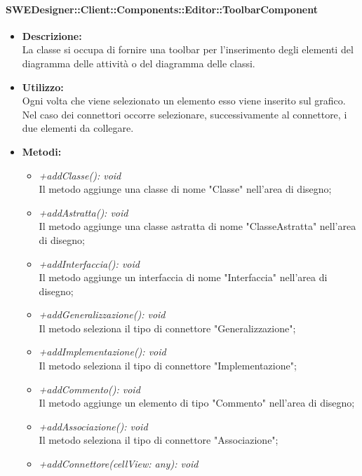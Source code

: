 			\paragraph{SWEDesigner::Client::Components::Editor::ToolbarComponent}
				\begin{itemize}
          			\item \textbf{Descrizione:}\\
          			La classe si occupa di fornire una toolbar per l'inserimento degli elementi del diagramma delle attività o del diagramma delle classi.
          			\item \textbf{Utilizzo:}\\
          			Ogni volta che viene selezionato un elemento esso viene inserito sul grafico. Nel caso dei connettori occorre selezionare, successivamente al connettore, i due elementi da collegare.
          			\item \textbf{Metodi:}\\
          			\begin{itemize}
          				\item \emph{+addClasse(): void}\\
          				Il metodo aggiunge una classe di nome "Classe" nell'area di disegno;
          				\item \emph{+addAstratta(): void}\\
          				Il metodo aggiunge una classe astratta di nome "ClasseAstratta" nell'area di disegno;
          				\item \emph{+addInterfaccia(): void}\\
          				Il metodo aggiunge un interfaccia di nome "Interfaccia" nell'area di disegno;
          				\item \emph{+addGeneralizzazione(): void}\\
          				Il metodo seleziona il tipo di connettore "Generalizzazione";
          				\item \emph{+addImplementazione(): void}\\
          				Il metodo seleziona il tipo di connettore "Implementazione";
          				\item \emph{+addCommento(): void}\\
          				Il metodo aggiunge un elemento di tipo "Commento" nell'area di disegno;
          				\item \emph{+addAssociazione(): void}\\
          				Il metodo seleziona il tipo di connettore "Associazione";
          				\item \emph{+addConnettore(cellView: any): void}\\

\end{itemize}
\end{itemize}
